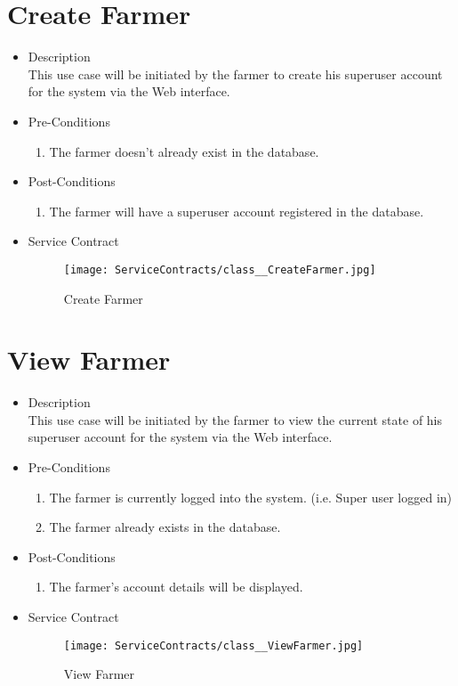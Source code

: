 \documentclass[11pt,fleqn]{book} %
\begin{document}
\section{Create Farmer}
\begin{itemize}
	\item Description\\
	This use case will be initiated by the farmer to create his superuser account for the system via the Web interface.
	\item Pre-Conditions
	\begin{enumerate}
		\item The farmer doesn’t already exist in the database.
	\end{enumerate}
	\item Post-Conditions
	\begin{enumerate}
		\item The farmer will have a superuser account registered in the database.
	\end{enumerate}
	\item Service Contract
	\begin{figure}
		\texttt{[image: ServiceContracts/class\_\_CreateFarmer.jpg]}
		\caption{Create Farmer}
	\end{figure}
\end{itemize}

\section{View Farmer}
\begin{itemize}
	\item Description\\
	This use case will be initiated by the farmer to view the current state of his superuser account for the system via the Web interface.
	\item Pre-Conditions
	\begin{enumerate}
		\item The farmer is currently logged into the system. (i.e. Super user logged in)
		\item The farmer already exists in the database.					
	\end{enumerate}
	\item Post-Conditions
	\begin{enumerate}
		\item The farmer’s account details will be displayed.
	\end{enumerate}
	\item Service Contract
	\begin{figure}
		\texttt{[image: ServiceContracts/class\_\_ViewFarmer.jpg]}
		\caption{View Farmer}
	\end{figure}
\end{itemize}
\end{document}
